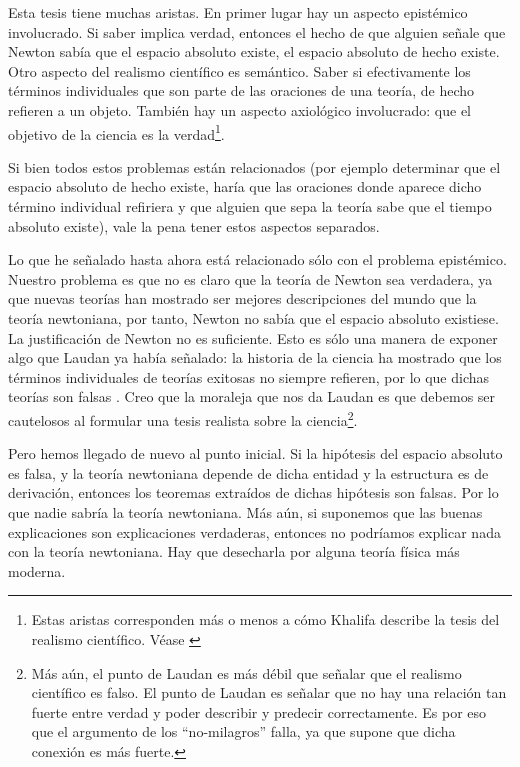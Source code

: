 Esta tesis tiene muchas aristas. En primer lugar hay un aspecto epistémico involucrado. Si saber implica verdad, entonces el hecho de que alguien señale que Newton sabía que el espacio absoluto existe, el espacio absoluto de hecho existe. Otro aspecto del realismo científico es semántico. Saber si efectivamente los términos individuales que son parte de las oraciones de una teoría, de hecho refieren a un objeto. También hay un aspecto axiológico involucrado: que el objetivo de la ciencia es la verdad\footnote{Estas aristas corresponden más o menos a cómo Khalifa describe la tesis del realismo científico. Véase \citeyear{Khalifa2010-KHASCA}}.

Si bien todos estos problemas están relacionados (por ejemplo determinar que el espacio absoluto de hecho existe, haría que las oraciones donde aparece dicho término individual refiriera y que alguien que sepa la teoría sabe que el tiempo absoluto existe), vale la pena tener estos aspectos separados. 

Lo que he señalado hasta ahora está relacionado sólo con el problema epistémico. Nuestro problema es que no es claro que la teoría de Newton sea verdadera, ya que nuevas teorías han mostrado ser mejores descripciones del mundo que la teoría newtoniana, por tanto, Newton no sabía que el espacio absoluto existiese. La justificación de Newton no es suficiente. Esto es sólo una manera de exponer algo que Laudan ya había señalado: la historia de la ciencia ha mostrado que los términos individuales de teorías exitosas no siempre refieren, por lo que dichas teorías son falsas \cite{Laudan1981}. Creo que la moraleja que nos da Laudan es que debemos ser cautelosos al formular una tesis realista sobre la ciencia\footnote{Más aún, el punto de Laudan es más débil que señalar que el realismo científico es falso. El punto de Laudan es señalar que no hay una relación tan fuerte entre verdad y poder describir y predecir correctamente. Es por eso que el argumento de los ``no-milagros'' falla, ya que supone que dicha conexión es más fuerte.}.

Pero hemos llegado de nuevo al punto inicial. Si la hipótesis del espacio absoluto es falsa, y la teoría newtoniana depende de dicha entidad y la estructura es de derivación, entonces los teoremas extraídos de dichas hipótesis son falsas. Por lo que nadie sabría la teoría newtoniana. Más aún, si suponemos que las buenas explicaciones son explicaciones verdaderas, entonces no podríamos explicar nada con la teoría newtoniana. Hay que desecharla por alguna teoría física más moderna.

